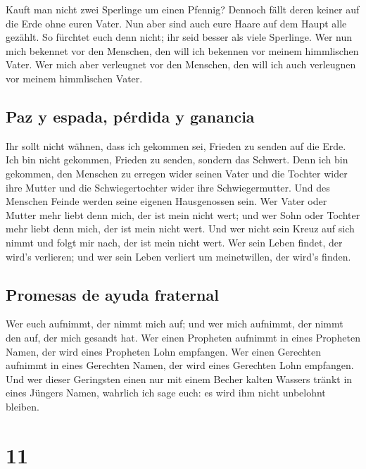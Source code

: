  Kauft man nicht zwei Sperlinge um einen Pfennig? Dennoch
fällt deren keiner auf die Erde ohne euren Vater.  Nun
aber sind auch eure Haare auf dem Haupt alle gezählt.  So
fürchtet euch denn nicht; ihr seid besser als viele Sperlinge.
 Wer nun mich bekennet vor den Menschen, den will ich
bekennen vor meinem himmlischen Vater.  Wer mich aber
verleugnet vor den Menschen, den will ich auch verleugnen vor meinem
himmlischen Vater.

\hypertarget{paz-y-espada-puxe9rdida-y-ganancia}{%
\subsection{Paz y espada, pérdida y
ganancia}\label{paz-y-espada-puxe9rdida-y-ganancia}}

 Ihr sollt nicht wähnen, dass ich gekommen sei, Frieden
zu senden auf die Erde. Ich bin nicht gekommen, Frieden zu senden,
sondern das Schwert.  Denn ich bin gekommen, den Menschen
zu erregen wider seinen Vater und die Tochter wider ihre Mutter und die
Schwiegertochter wider ihre Schwiegermutter.  Und des
Menschen Feinde werden seine eigenen Hausgenossen sein. 
Wer Vater oder Mutter mehr liebt denn mich, der ist mein nicht wert; und
wer Sohn oder Tochter mehr liebt denn mich, der ist mein nicht wert.
 Und wer nicht sein Kreuz auf sich nimmt und folgt mir
nach, der ist mein nicht wert.  Wer sein Leben findet,
der wird's verlieren; und wer sein Leben verliert um meinetwillen, der
wird's finden.

\hypertarget{promesas-de-ayuda-fraternal}{%
\subsection{Promesas de ayuda
fraternal}\label{promesas-de-ayuda-fraternal}}

 Wer euch aufnimmt, der nimmt mich auf; und wer mich
aufnimmt, der nimmt den auf, der mich gesandt hat.  Wer
einen Propheten aufnimmt in eines Propheten Namen, der wird eines
Propheten Lohn empfangen. Wer einen Gerechten aufnimmt in eines
Gerechten Namen, der wird eines Gerechten Lohn empfangen.
 Und wer dieser Geringsten einen nur mit einem Becher
kalten Wassers tränkt in eines Jüngers Namen, wahrlich ich sage euch: es
wird ihm nicht unbelohnt bleiben.

\hypertarget{section-10}{%
\section{11}\label{section-10}}

